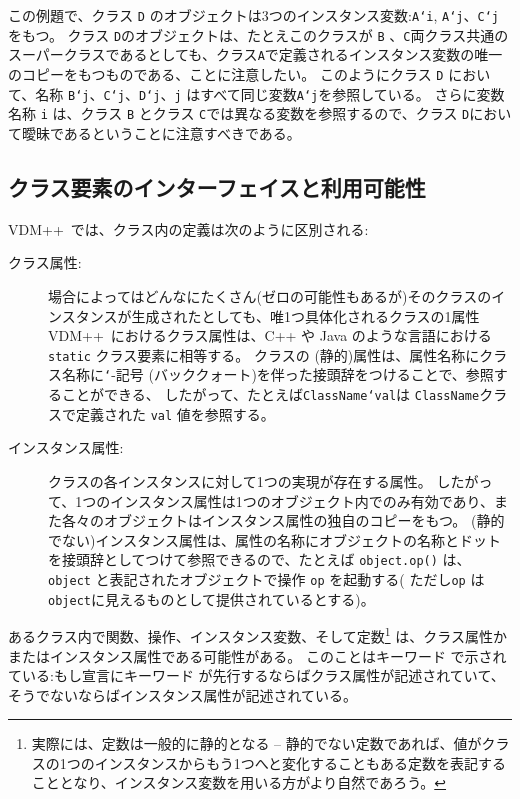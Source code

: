 \documentclass[\pformat,12pt]{jarticle}
\newcommand{\vdmpp}{VDM++}
\newcommand{\vppsmall}{\small\tt}
\begin{document}
この例題で、クラス {\tt D} のオブジェクトは3つのインスタンス変数:{\tt A`i}, {\tt A`j}、{\tt C`j}をもつ。 
クラス {\tt D}のオブジェクトは、たとえこのクラスが {\tt B} 、{\tt C}両クラス共通のスーパークラスであるとしても、クラス{\tt A}で定義されるインスタンス変数の唯一のコピーをもつものである、ことに注意したい。
このようにクラス {\tt D} において、名称 {\tt B`j}、{\tt C`j}、{\tt D`j}、{\tt j} はすべて同じ変数{\tt A`j}を参照している。
さらに変数名称 {\tt i} は、クラス {\tt B} とクラス {\tt C}では異なる変数を参照するので、クラス {\tt D}において曖昧であるということに注意すべきである。

\subsection{クラス要素のインターフェイスと利用可能性}\label{ch:interface}

\vdmpp\ では、クラス内の定義は次のように区別される:

\begin{description}
\item[クラス属性:] 場合によってはどんなにたくさん(ゼロの可能性もあるが)そのクラスのインスタンスが生成されたとしても、唯1つ具体化されるクラスの1属性
 \vdmpp\ におけるクラス属性は、C++ や Java のような言語における {\tt static} クラス要素に相等する。
クラスの (静的)属性は、属性名称にクラス名称に{\vppsmall `}-記号 (バッククォート)を伴った接頭辞をつけることで、参照することができる、
したがって、たとえば{\tt ClassName`val}は {\tt ClassName}クラスで定義された {\tt val} 値を参照する。

\item[インスタンス属性:] クラスの各インスタンスに対して1つの実現が存在する属性。
したがって、1つのインスタンス属性は1つのオブジェクト内でのみ有効であり、また各々のオブジェクトはインスタンス属性の独自のコピーをもつ。
(静的でない)インスタンス属性は、属性の名称にオブジェクトの名称とドットを接頭辞としてつけて参照できるので、たとえば {\tt object.op()} は、{\tt object} と表記されたオブジェクトで操作 {\tt op} を起動する( ただし\texttt{op} は  \texttt{object}に見えるものとして提供されているとする)。
\end{description}

あるクラス内で関数、操作、インスタンス変数、そして定数\footnote{実際には、定数は一般的に静的となる -- 静的でない定数であれば、値がクラスの1つのインスタンスからもう1つへと変化することもある定数を表記することとなり、インスタンス変数を用いる方がより自然であろう。} は、クラス属性かまたはインスタンス属性である可能性がある。
このことはキーワード で示されている:もし宣言にキーワード  が先行するならばクラス属性が記述されていて、そうでないならばインスタンス属性が記述されている。
\end{document}
